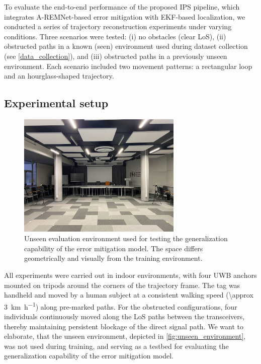 To evaluate the end-to-end performance of the proposed IPS pipeline, which integrates A-REMNet-based error mitigation with EKF-based localization, we conducted a series of trajectory reconstruction experiments under varying conditions. Three scenarios were tested: (i) no obstacles (clear LoS), (ii) obstructed paths in a known (seen) environment used during dataset collection (see \autoref{data_collection}), and (iii) obstructed paths in a previously unseen environment. Each scenario included two movement patterns: a rectangular loop and an hourglass-shaped trajectory.

\subsection{Experimental setup}

\begin{figure}[tbh]
    \centering
    \includegraphics[width=0.7\textwidth]{Graphics/evaluation_env.JPG}
    \caption[Unseen evaluation environment.]{Unseen evaluation environment used for testing the generalization capability of the error mitigation model. The space differs geometrically and visually from the training environment.}
    \label{fig:unseen_environment}
\end{figure}

All experiments were carried out in indoor environments, with four UWB anchors mounted on tripods around the corners of the trajectory frame. The tag was handheld and moved by a human subject at a consistent walking speed (\SI[per-mode=symbol]{\approx 3}{\kilo\metre\per\hour}) along pre-marked paths. For the obstructed configurations, four individuals continuously moved along the LoS paths between the transceivers, thereby maintaining persistent blockage of the direct signal path. We want to elaborate, that the unseen environment, depicted in \autoref{fig:unseen_environment}, was not used during training, and serving as a testbed for evaluating the generalization capability of the error mitigation model.


